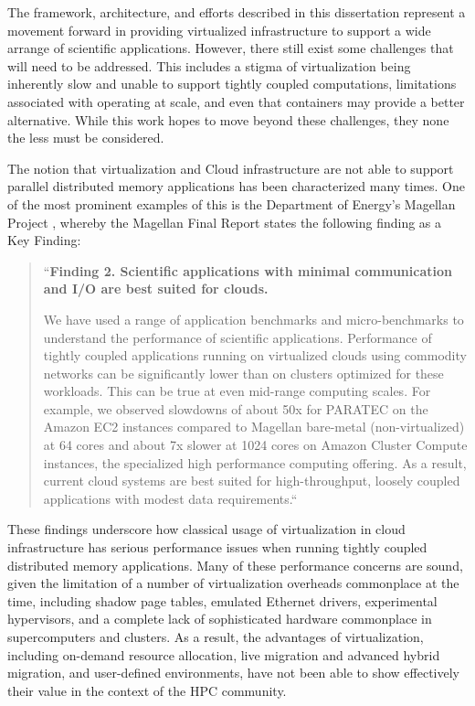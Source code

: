 The framework, architecture, and efforts described in this dissertation represent a movement forward in providing virtualized infrastructure to support a wide arrange of scientific applications. However, there still exist some challenges that will need to be addressed.  This includes a stigma of virtualization being inherently slow and unable to support tightly coupled computations, limitations associated with  operating at scale, and even that containers may provide a better alternative.  While this work hopes to move beyond these challenges, they none the less must be considered. 

The notion that virtualization and Cloud infrastructure are not able to support parallel distributed memory applications has been characterized many times. One of the most prominent examples of this is the Department of Energy's Magellan Project \cite{www-magellan}, whereby the Magellan Final Report \cite{MagellanFinal} states the following finding as a Key Finding:
  
\begin{quote}
``\textbf{Finding 2. Scientific applications with minimal communication and I/O are best suited for clouds.}

We have used a range of application benchmarks and micro-benchmarks to understand the performance of scientific applications. Performance of tightly coupled applications running on virtualized clouds using commodity networks can be significantly lower than on clusters optimized for these workloads. This can be true at even mid-range computing scales. For example, we observed slowdowns of about 50x for PARATEC on the Amazon EC2 instances compared to Magellan bare-metal (non-virtualized) at 64 cores and about 7x slower at 1024 cores on Amazon Cluster Compute instances, the specialized high performance computing offering. As a result, current cloud systems are best suited for high-throughput, loosely coupled applications with modest data requirements.``
\end{quote}

These findings underscore how classical usage of virtualization in cloud infrastructure has serious performance issues when running tightly coupled distributed memory applications. Many of these performance concerns are sound, given the limitation of a number of virtualization overheads commonplace at the time, including shadow page tables, emulated Ethernet drivers, experimental hypervisors, and a complete lack of sophisticated hardware commonplace in supercomputers and clusters.  As a result, the advantages of virtualization, including on-demand resource allocation, live migration and advanced hybrid migration, and user-defined environments, have not been able to show effectively their value in the context of the HPC community.

